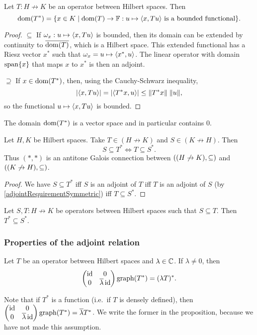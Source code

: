 \begin{proposition} \label{adjointDomain}
Let $T: H\not\to K$ be an operator between Hilbert spaces. Then
\[ \dom(T^*) = \setbuilder{x\in K}{\text{$\dom(T)\to \F: u\mapsto \inner{x, Tu}$ is a bounded functional}}. \]
\end{proposition}
\begin{proof}
$\boxed{\subseteq}$ If $\omega_x: u\mapsto \inner{x, Tu}$ is bounded, then its domain can be extended by continuity to $\overline{\operatorname{dom}(T)}$, which is a Hilbert space. This extended functional has a Riesz vector $x^*$ such that $\omega_x = u\mapsto \inner{x^*, u}$. The linear operator with domain $\operatorname{span}\{x\}$ that maps $x$ to $x^*$ is then an adjoint.

$\boxed{\supseteq}$ If $x\in\operatorname{dom}(T^*)$, then, using the Cauchy-Schwarz inequality,
\[ |\inner{x,Tu}| = |\inner{T^*x,u}| \leq \norm{T^*x}\;\norm{u}, \]
so the functional $u\mapsto \inner{x, Tu}$ is bounded.
\end{proof}
\begin{corollary}
The domain $\operatorname{dom}(T^*)$ is a vector space and in particular contains $0$.
\end{corollary}

\begin{proposition} \label{HilbertAdjointGaloisConnection}
Let $H, K$ be Hilbert spaces. Take $T\in (H\not\to K)$ and $S\in (K\not\to H)$. Then
\[ S \subseteq T^* \iff T\subseteq S^*. \]
Thus $(*,*)$ is an antitone Galois connection between $\sSet{(H\not\to K), \subseteq}$ and $\sSet{(K\not\to H), \subseteq}$.
\end{proposition}
\begin{proof}
We have $S \subseteq T^*$ iff $S$ is an adjoint of $T$ iff $T$ is an adjoint of $S$ (by \ref{adjointRequirementSymmetric}) iff $T\subseteq S^*$.
\end{proof}
\begin{corollary} \label{HilbertAdjointAntitone}
Let $S,T: H\not\to K$ be operators between Hilbert spaces such that $S\subseteq T$. Then $T^* \subseteq S^*$.
\end{corollary}
\subsubsection{Properties of the adjoint relation}

\begin{proposition} \label{adjointScalarMultiple}
Let $T$ be an operator between Hilbert spaces and $\lambda\in\mathbb{C}$. If $\lambda \neq 0$, then
\[ \begin{pmatrix}
\operatorname{id} & 0 \\ 0 & \overline{\lambda}\operatorname{id}
\end{pmatrix} \operatorname{graph}(T^*) = (\lambda T)^*. \]
\end{proposition}
Note that if $T^*$ is a function (i.e.\ if $T$ is densely defined), then $\begin{pmatrix}
\operatorname{id} & 0 \\ 0 & \overline{\lambda}\operatorname{id}
\end{pmatrix} \operatorname{graph}(T^*) = \overline{\lambda}T^*$. We write the former in the proposition, because we have not made this assumption.

